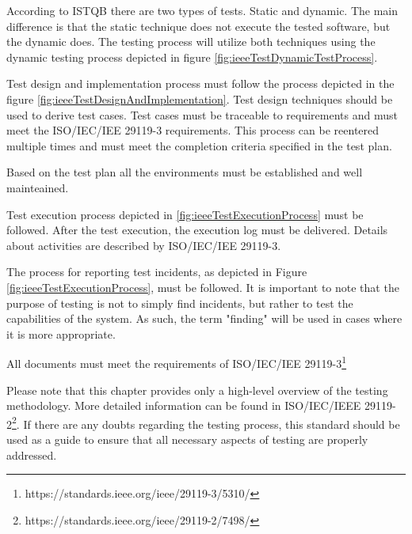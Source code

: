 According to ISTQB \cite{FoundationOfSoftwareTesting} there are two types of tests. Static and dynamic. The main difference is that the static technique does not execute the tested software, but the dynamic does. The testing process will utilize both techniques using the dynamic testing process depicted in figure \ref{fig:ieeeTestDynamicTestProcess}.


Test design and implementation process must follow the process depicted in the figure \ref{fig:ieeeTestDesignAndImplementation}. Test design techniques should be used to derive test cases. Test cases must be traceable to requirements and must meet the ISO/IEC/IEE 29119-3 requirements. This process can be reentered multiple times and must meet the completion criteria specified in the test plan.


Based on the test plan all the environments must be established and well mainteained.

Test execution process depicted in \ref{fig:ieeeTestExecutionProcess} must be followed. After the test execution, the execution log must be delivered. Details about activities are described by ISO/IEC/IEE 29119-3.


The process for reporting test incidents, as depicted in Figure \ref{fig:ieeeTestExecutionProcess}, must be followed. It is important to note that the purpose of testing is not to simply find incidents, but rather to test the capabilities of the system. As such, the term "finding" will be used in cases where it is more appropriate.

All documents must meet the requirements of ISO/IEC/IEE 29119-3\footnote{https://standards.ieee.org/ieee/29119-3/5310/}

Please note that this chapter provides only a high-level overview of the testing methodology. More detailed information can be found in ISO/IEC/IEEE 29119-2\footnote{https://standards.ieee.org/ieee/29119-2/7498/}. If there are any doubts regarding the testing process, this standard should be used as a guide to ensure that all necessary aspects of testing are properly addressed.










